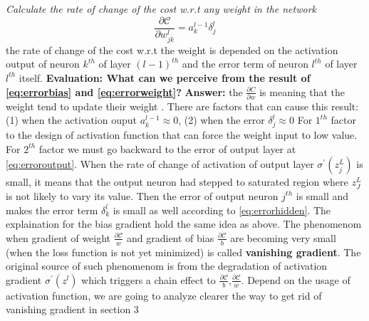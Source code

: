 \vspace{1.5cm}\noindent
\textit{Calculate the rate of change of the cost w.r.t any weight in the network}
\begin{equation}%
    \frac{\partial \mathcal{C}}{\partial w^{l}_{jk}} = a^{l-1}_{k} \delta^{l}_{j} \label{eq:errorweight}
\end{equation}
the rate of change of the cost w.r.t the weight is depended on the activation output of neuron $k^{th}$ of layer $(l-1)^{th}$ and the error term of neuron $l^{th}$ of layer $l^{th}$ itself.\newline\noindent
\newline\noindent
\textbf{Evaluation: What can we perceive from the result of \eqref{eq:errorbias} and \eqref{eq:errorweight}?}\newline\noindent
\textbf{Answer:} the $\frac{\partial C}{\partial w}$ is \underline{} meaning that the weight tend to update their weight \underline{}. There are factors that can cause this result: (1) when the activation ouput $a^{l-1}_{k} \approx 0$, (2) when the error $\delta^{l}_{j} \approx 0$\newline \noindent
For $1^{th}$ factor to the design of activation function that can force the weight input to low value.\newline\noindent
For $2^{th}$ factor we must go backward to the error of output layer at \eqref{eq:erroroutput}. When the rate of change of activation of output layer $\sigma^{'}(z^{L}_{j})$ is small, it means that the output neuron had stepped to saturated region where $z^{L}_{J}$ is not likely to vary its value. Then the error of output neuron $j^{th}$ is small and makes the error term $\delta^{l}_{k}$ is small as well according to \eqref{eq:errorhidden}.\newline \noindent
The explaination for the bias gradient hold the same idea as above. The phenomenom when gradient of weight $\frac{\partial \mathcal{C}}{w}$ and gradient of bias $\frac{\partial \mathcal{C}}{b}$ are becoming very small \underline{} (when the loss function is not yet minimized) is called \textbf{vanishing gradient}. The original source of such phenomenom is from the degradation of activation gradient $\sigma^{'}(z^{l})$ which triggers a chain effect to $\frac{\partial \mathcal{C}}{b}$,$\frac{\partial \mathcal{C}}{w}$. Depend on the usage of activation function, we are going to analyze clearer the way to get rid of vanishing gradient in section 3\newline\noindent
\newline\noindent
